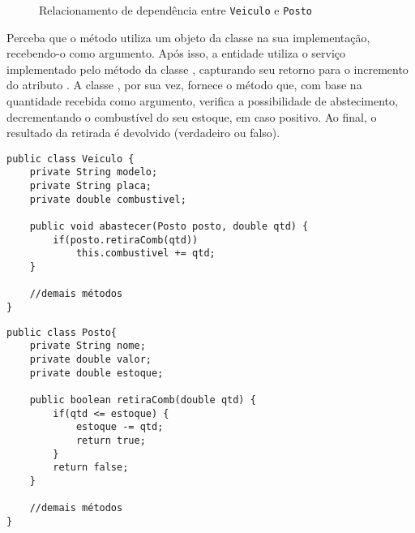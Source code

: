 \begin{figure}[h]
	\centering
	
	
	\caption{Relacionamento de dependência entre \texttt{Veiculo} e \texttt{Posto}}
	\label{fig:dependencia-veiculo-posto}
\end{figure}

Perceba que o método  utiliza um objeto da classe  na sua implementação, recebendo-o como argumento. Após isso, a entidade  utiliza o serviço implementado pelo método  da classe , capturando seu retorno para o incremento do atributo . A classe , por sua vez, fornece o método  que, com base na quantidade recebida como argumento, verifica a possibilidade de abstecimento, decrementando o combustível do seu estoque, em caso positivo. Ao final, o resultado da retirada é devolvido (verdadeiro ou falso).

\begin{verbatim}
public class Veiculo {
	private String modelo;
	private String placa;
	private double combustivel;
	
	public void abastecer(Posto posto, double qtd) {
		if(posto.retiraComb(qtd))
			this.combustivel += qtd;
	}
	
	//demais métodos
}
\end{verbatim}

\begin{verbatim}
public class Posto{
	private String nome;
	private double valor;
	private double estoque;

	public boolean retiraComb(double qtd) {
		if(qtd <= estoque) {
			estoque -= qtd;
			return true;
		}
		return false;
	}
	
	//demais métodos
}
\end{verbatim}

